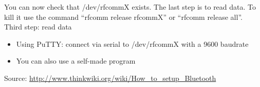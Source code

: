 You can now check that /dev/rfcommX exists. The last step is to read data.
To kill it use the command ``rfcomm release rfcommX'' or ``rfcomm release all''.\\

Third step: read data\\
\begin{itemize}
  \item Using PuTTY: connect via serial to /dev/rfcommX with a 9600 baudrate
  \item You can also use a self-made program
\end{itemize}

Source: \url{http://www.thinkwiki.org/wiki/How\_to\_setup\_Bluetooth}
